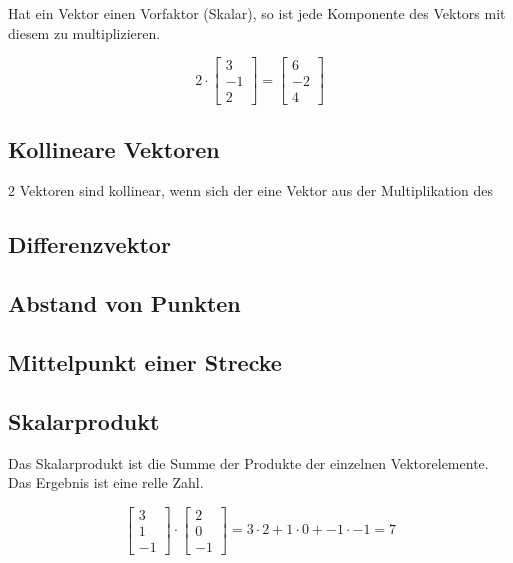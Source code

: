Hat ein Vektor einen Vorfaktor (Skalar), so ist jede Komponente
des Vektors mit diesem zu multiplizieren.

\begin{equation*}
    2 \cdot
    \begin{bmatrix}
        3 \\
        -1 \\
        2
    \end{bmatrix}
    =
    \begin{bmatrix}
        6 \\
        -2 \\
        4
    \end{bmatrix}
\end{equation*}

\subsection{Kollineare Vektoren}

2 Vektoren sind kollinear, wenn sich der eine Vektor aus der Multiplikation
des 

\subsection{Differenzvektor}

\subsection{Abstand von Punkten}

\subsection{Mittelpunkt einer Strecke}

\subsection{Skalarprodukt}

Das Skalarprodukt ist die Summe der Produkte der einzelnen Vektorelemente.
Das Ergebnis ist eine relle Zahl.

\begin{equation*}
    \begin{bmatrix}
        3 \\
        1 \\
        -1
    \end{bmatrix} \cdot
    \begin{bmatrix}
        2 \\
        0 \\
        -1
    \end{bmatrix} = 3 \cdot 2 + 1 \cdot 0 + -1 \cdot -1 = 7
\end{equation*}

